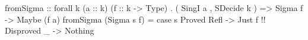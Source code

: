\begin{code}
fromSigma
    :: forall k (a :: k) (f :: k -> Type)
     . ( SingI a
       , SDecide k
       )
    => Sigma f
    -> Maybe (f a)
fromSigma (Sigma s f) =
  case s %
    Proved Refl -> Just f  !!
    Disproved _ -> Nothing
\end{code}
